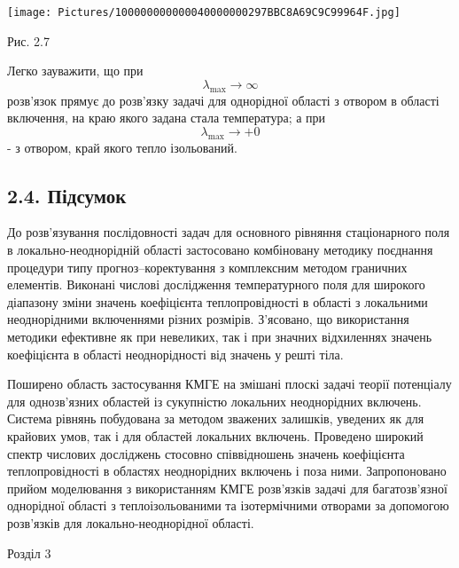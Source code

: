 \texttt{[image: Pictures/100000000000040000000297BBC8A69C9C99964F.jpg]}

Рис. 2.7

Легко зауважити, що при \[{\lambda_{\text{max}}\rightarrow\infty}{}\]
розв'язок прямує до розв'язку задачі для однорідної області з отвором в
області включення, на краю якого задана стала температура; а при
\[{\lambda_{\text{max}}{\rightarrow + 0}}{}\] - з отвором, край якого
тепло ізольований.

\hypertarget{ux43fux456ux434ux441ux443ux43cux43eux43a}{%
\subsection[2.4.
Підсумок]{\texorpdfstring{\protect\hypertarget{anchor-43}{}{}2.4.
Підсумок}{2.4. Підсумок}}\label{ux43fux456ux434ux441ux443ux43cux43eux43a}}

До розв'язування послідовності задач для основного рівняння
стаціонарного поля в локально-неоднорідній області застосовано
комбіновану методику поєднання процедури типу прогноз--коректування з
комплексним методом граничних елементів. Виконані числові дослідження
температурного поля для широкого діапазону зміни значень коефіцієнта
теплопровідності в області з локальними неоднорідними включеннями різних
розмірів. З'ясовано, що використання методики ефективне як при
невеликих, так і при значних відхиленнях значень коефіцієнта в області
неоднорідності від значень у решті тіла.

Поширено область застосування КМГЕ на змішані плоскі задачі теорії
потенціалу для однозв'язних областей із сукупністю локальних
неоднорідних включень. Система рівнянь побудована за методом зважених
залишків, уведених як для крайових умов, так і для областей локальних
включень. Проведено широкий спектр числових досліджень стосовно
співвідношень значень коефіцієнта теплопровідності в областях
неоднорідних включень і поза ними. Запропоновано прийом моделювання з
використанням КМГЕ розв'язків задачі для багатозв'язної однорідної\emph{
}області з теплоізольованими та ізотермічними отворами за допомогою
розв'язків для локально-неоднорідної\emph{ }області.

Розділ 3

